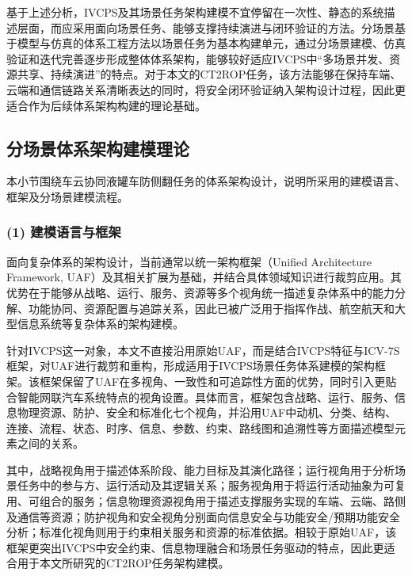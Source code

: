     基于上述分析，IVCPS及其场景任务架构建模不宜停留在一次性、静态的系统描述层面，而应采用面向场景任务、能够支撑持续演进与闭环验证的方法。分场景基于模型与仿真的体系工程方法以场景任务为基本构建单元，通过分场景建模、仿真验证和迭代完善逐步形成整体体系架构，能够较好适应IVCPS中“多场景并发、资源共享、持续演进”的特点。对于本文的CT2ROP任务，该方法能够在保持车端、云端和通信链路关系清晰表达的同时，将安全闭环验证纳入架构设计过程，因此更适合作为后续体系架构构建的理论基础。

  \subsection{分场景体系架构建模理论}

    本小节围绕车云协同液罐车防侧翻任务的体系架构设计，说明所采用的建模语言、框架及分场景建模流程。

    \subsubsection*{(1) 建模语言与框架}

      面向复杂体系的架构设计，当前通常以统一架构框架（Unified Architecture Framework, UAF）及其相关扩展为基础，并结合具体领域知识进行裁剪应用\cite{hause2020uafple,hause2021securityviews,hause2021serviceviews,abhaya2021ubm}。其优势在于能够从战略、运行、服务、资源等多个视角统一描述复杂体系中的能力分解、功能协同、资源配置与追踪关系，因此已被广泛用于指挥作战、航空航天和大型信息系统等复杂体系的架构建模\cite{qianqunyou2024uafurbancombat,lvweimin2021dodaf,cuiruijing2025uafindicator,lidelin2024uafcooperation,liminghua2021aerospace,huangran2024lunarserviceuaf,lisong2022uafairtransportation}。

      针对IVCPS这一对象，本文不直接沿用原始UAF，而是结合IVCPS特征与ICV-7S框架，对UAF进行裁剪和重构，形成适用于IVCPS场景任务体系建模的架构框架\cite{qixiaojing2026mbsose,xu2023mbseivcps}。该框架保留了UAF在多视角、一致性和可追踪性方面的优势，同时引入更贴合智能网联汽车系统特点的视角设置。具体而言，框架包含战略、运行、服务、信息物理资源、防护、安全和标准化七个视角，并沿用UAF中动机、分类、结构、连接、流程、状态、时序、信息、参数、约束、路线图和追溯性等方面描述模型元素之间的关系。

      其中，战略视角用于描述体系阶段、能力目标及其演化路径；运行视角用于分析场景任务中的参与方、运行活动及其逻辑关系；服务视角用于将运行活动抽象为可复用、可组合的服务；信息物理资源视角用于描述支撑服务实现的车端、云端、路侧及通信等资源；防护视角和安全视角分别面向信息安全与功能安全/预期功能安全分析；标准化视角则用于约束相关服务和资源的标准依据。相较于原始UAF，该框架更突出IVCPS中安全约束、信息物理融合和场景任务驱动的特点，因此更适合用于本文所研究的CT2ROP任务架构建模。

